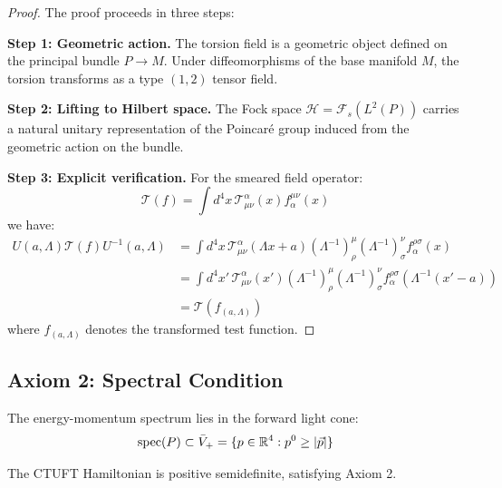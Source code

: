 \begin{proof}
The proof proceeds in three steps:

\textbf{Step 1: Geometric action.} The torsion field is a geometric object defined on the principal bundle $P \to M$. Under diffeomorphisms of the base manifold $M$, the torsion transforms as a type $(1,2)$ tensor field.

\textbf{Step 2: Lifting to Hilbert space.} The Fock space $\mathcal{H} = \mathcal{F}_s(L^2(P))$ carries a natural unitary representation of the Poincar\'{e} group induced from the geometric action on the bundle.

\textbf{Step 3: Explicit verification.} For the smeared field operator:
\begin{equation}
    \mathcal{T}(f) = \int d^4x \, \mathcal{T}^\alpha_{\mu\nu}(x) f_\alpha^{\mu\nu}(x)
\end{equation}
we have:
\begin{align}
    U(a, \Lambda) \mathcal{T}(f) U^{-1}(a, \Lambda) &= \int d^4x \, \mathcal{T}^\alpha_{\mu\nu}(\Lambda x + a) (\Lambda^{-1})^\mu_\rho (\Lambda^{-1})^\nu_\sigma f_\alpha^{\rho\sigma}(x) \\
    &= \int d^4x' \, \mathcal{T}^\alpha_{\mu\nu}(x') (\Lambda^{-1})^\mu_\rho (\Lambda^{-1})^\nu_\sigma f_\alpha^{\rho\sigma}(\Lambda^{-1}(x' - a)) \\
    &= \mathcal{T}(f_{(a,\Lambda)})
\end{align}
where $f_{(a,\Lambda)}$ denotes the transformed test function.
\end{proof}

\subsection{Axiom 2: Spectral Condition}

\begin{axiom}
The energy-momentum spectrum lies in the forward light cone:
\begin{equation}
    \mathrm{spec}(P) \subset \bar{V}_+ = \{p \in \mathbb{R}^4 : p^0 \geq |\vec{p}|\}
\end{equation}
\end{axiom}

\begin{theorem}
The CTUFT Hamiltonian is positive semidefinite, satisfying Axiom 2.
\end{theorem}

